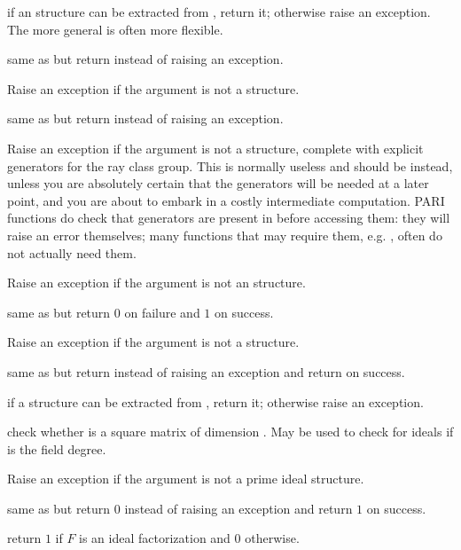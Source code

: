  if an  structure can be extracted from
, return it; otherwise raise an exception. The more general
 is often more flexible.

 same as  but return 
instead of raising an exception.

 Raise an exception if the argument
is not a  structure.

 same as  but return 
instead of raising an exception.

 Raise an exception if the argument is not a
 structure, complete with explicit generators for the ray class group.
This is normally useless and  should be instead, unless
you are absolutely certain that the generators will be needed at a later
point, and you are about to embark in a costly intermediate computation.
PARI functions do check that generators are present in  before
accessing them: they will raise an error themselves; many functions
that may require them, e.g. , often
do not actually need them.

 Raise an exception if the argument is not an
 structure.

 same as  but return $0$
on failure and $1$ on success.

 Raise an exception if the argument is not a
 structure.

 same as  but return 
instead of raising an exception and return  on success.

 if a  structure can be extracted
from , return it; otherwise raise an exception.

 check whether  is a square matrix
of dimension . May be used to check for ideals if  is the field
degree.

 Raise an exception if the argument is not a
prime ideal structure.

 same as  but return $0$
instead of raising an exception and return $1$ on success.

 return $1$ if $F$ is an ideal factorization
and $0$ otherwise.

